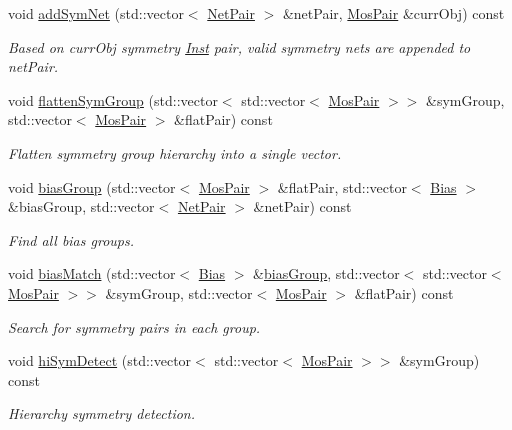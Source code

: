 \begin{DoxyCompactItemize}
void \hyperlink{classSymDetect_a3d47390c92f0bd31d1ab84f1a62d66e3}{add\+Sym\+Net} (std\+::vector$<$ \hyperlink{classNetPair}{Net\+Pair} $>$ \&net\+Pair, \hyperlink{classMosPair}{Mos\+Pair} \&curr\+Obj) const
\begin{DoxyCompactList}\small\item\em Based on curr\+Obj symmetry \hyperlink{classInst}{Inst} pair, valid symmetry nets are appended to net\+Pair. \end{DoxyCompactList}\item 
void \hyperlink{classSymDetect_a4c50f078fd01ab52e8f50b0507b69556}{flatten\+Sym\+Group} (std\+::vector$<$ std\+::vector$<$ \hyperlink{classMosPair}{Mos\+Pair} $>$$>$ \&sym\+Group, std\+::vector$<$ \hyperlink{classMosPair}{Mos\+Pair} $>$ \&flat\+Pair) const
\begin{DoxyCompactList}\small\item\em Flatten symmetry group hierarchy into a single vector. \end{DoxyCompactList}\item 
void \hyperlink{classSymDetect_a1f9fc68f67c56771e6b9b613b53c821f}{bias\+Group} (std\+::vector$<$ \hyperlink{classMosPair}{Mos\+Pair} $>$ \&flat\+Pair, std\+::vector$<$ \hyperlink{classBias}{Bias} $>$ \&bias\+Group, std\+::vector$<$ \hyperlink{classNetPair}{Net\+Pair} $>$ \&net\+Pair) const
\begin{DoxyCompactList}\small\item\em Find all bias groups. \end{DoxyCompactList}\item 
void \hyperlink{classSymDetect_a4c7109dd0519c1c11765fe00f4a21fe2}{bias\+Match} (std\+::vector$<$ \hyperlink{classBias}{Bias} $>$ \&\hyperlink{classSymDetect_a1f9fc68f67c56771e6b9b613b53c821f}{bias\+Group}, std\+::vector$<$ std\+::vector$<$ \hyperlink{classMosPair}{Mos\+Pair} $>$$>$ \&sym\+Group, std\+::vector$<$ \hyperlink{classMosPair}{Mos\+Pair} $>$ \&flat\+Pair) const
\begin{DoxyCompactList}\small\item\em Search for symmetry pairs in each group. \end{DoxyCompactList}\item 
void \hyperlink{classSymDetect_a81ec317ab0f508b3e0af483ef8a2c1ac}{hi\+Sym\+Detect} (std\+::vector$<$ std\+::vector$<$ \hyperlink{classMosPair}{Mos\+Pair} $>$$>$ \&sym\+Group) const
\begin{DoxyCompactList}\small\item\em Hierarchy symmetry detection. \end{DoxyCompactList}\end{DoxyCompactItemize}
